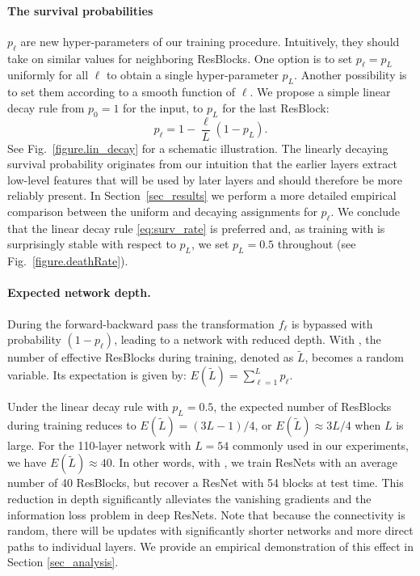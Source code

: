 \paragraph{\textbf{The survival probabilities}} $p_\ell$ are new hyper-parameters of our training procedure. Intuitively, they should take on similar values for neighboring ResBlocks. One option is to set $p_\ell=p_L$ uniformly for all $\ell$ to obtain a single hyper-parameter $p_L$. Another possibility is to set them according to a smooth function of $\ell$. We propose a simple linear decay rule from $p_0=1$ for the input, to $p_L$ for the last ResBlock:
\begin{equation}
\label{eq:surv_rate}
 p_\ell = 1-\frac{\ell}{L}(1-p_L).
\end{equation}
See Fig.~\ref{figure.lin_decay} for a schematic illustration.
The linearly decaying survival probability originates from our intuition that the earlier layers extract low-level features that will be used by later layers and should therefore be more reliably present.
In Section~\ref{sec_results} we perform a more detailed empirical comparison between the uniform and decaying assignments for $p_\ell$.  We conclude that the linear decay rule \eqref{eq:surv_rate} is preferred and, as training with \name{} is surprisingly stable with respect to $p_L$, we set $p_L=0.5$ throughout (see Fig.~\ref{figure.deathRate}).

\paragraph{\textbf{Expected network depth}.}
During the forward-backward pass the transformation $f_\ell$ is bypassed with probability $(\!1-p_\ell\!)$, leading to a network with reduced depth.
With \name{}, the number of effective ResBlocks during training, denoted as $\tilde{L}$, becomes a random variable. Its expectation is given by:
$
E(\tilde{L}) =  \sum\nolimits_{\ell=1}^L p_\ell.
$

Under the linear decay rule with $p_L=0.5$, the expected number of ResBlocks during training reduces to $E(\tilde{L})=(3L-1)/4$, or $E(\tilde{L})\approx 3L/4$ when $L$ is large. For the 110-layer network with $L=54$ commonly used in our experiments, we have $E(\tilde{L})\approx 40$. In other words, with \name{}, we train ResNets with an average number of 40 ResBlocks, but recover a ResNet with 54 blocks at test time.
This reduction in depth significantly alleviates the vanishing gradients and the information loss problem in deep ResNets. Note that because the connectivity is random, there will be updates with significantly shorter networks and more direct paths to individual layers. We provide an empirical demonstration of this effect in Section \ref{sec_analysis}.

